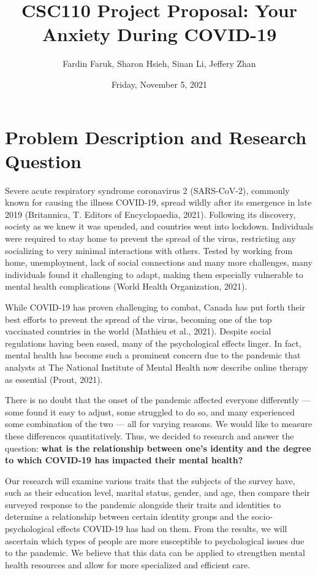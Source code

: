 \documentclass[fontsize=11pt]{article}
\title{CSC110 Project Proposal: Your Anxiety During COVID-19}
\author{Fardin Faruk, Sharon Hsieh, Sinan Li, Jeffery Zhan}
\date{Friday, November 5, 2021}
\begin{document}
    \maketitle

    \section*{Problem Description and Research Question}

    Severe acute respiratory syndrome coronavirus 2 (SARS-CoV-2), commonly known for causing the illness COVID-19, spread wildly after its emergence in late 2019 (Britannica, T. Editors of Encyclopaedia, 2021).
    Following its discovery, society as we knew it was upended, and countries went into lockdown.
    Individuals were required to stay home to prevent the spread of the virus, restricting any socializing to very minimal interactions with others.
    Tested by working from home, unemployment, lack of social connections and many more challenges, many individuals found it challenging to adapt, making them especially vulnerable to mental health complications (World Health Organization, 2021).

    While COVID-19 has proven challenging to combat, Canada has put forth their best efforts to prevent the spread of the virus, becoming one of the top vaccinated countries in the world (Mathieu et al., 2021).
    Despite social regulations having been eased, many of the psychological effects linger.
    In fact, mental health has become such a prominent concern due to the pandemic that analysts at The National Institute of Mental Health now describe online therapy as essential (Prout, 2021).

    There is no doubt that the onset of the pandemic affected everyone differently — some found it easy to adjust, some struggled to do so, and many experienced some combination of the two — all for varying reasons.
    We would like to measure these differences quantitatively.
    Thus, we decided to research and answer the question: \textbf{what is the relationship between one’s identity and the degree to which COVID-19 has impacted their mental health?}

    Our research will examine various traits that the subjects of the survey have, such as their education level, marital status, gender, and age, then compare their surveyed response to the pandemic alongside their traits and identities to determine a relationship between certain identity groups and the socio-psychological effects COVID-19 has had on them.
    From the results, we will ascertain which types of people are more susceptible to psychological issues due to the pandemic.
    We believe that this data can be applied to strengthen mental health resources and allow for more specialized and efficient care.
\end{document}
